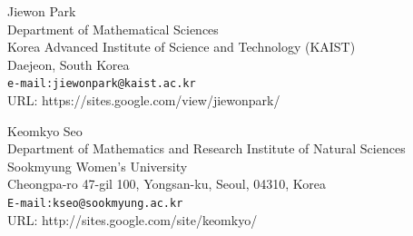 \documentclass[11pt]{article}
\begin{document}
\newpage

\noindent Jiewon Park\\
Department of Mathematical Sciences\\
Korea Advanced Institute of Science and Technology (KAIST)\\
Daejeon, South Korea\\
{\tt e-mail:jiewonpark@kaist.ac.kr}\\
URL: https://sites.google.com/view/jiewonpark/


\bigskip
\noindent Keomkyo Seo\\
Department of Mathematics and Research Institute of Natural Sciences\\
Sookmyung Women's University\\
Cheongpa-ro 47-gil 100, Yongsan-ku, Seoul, 04310, Korea \\
{\tt E-mail:kseo@sookmyung.ac.kr}\\
URL: http://sites.google.com/site/keomkyo/
\end{document}
